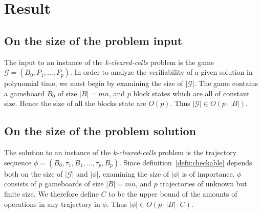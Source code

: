 \section{Result}

\subsection{On the size of the problem input}
The input to an instance of the \textit{k-cleared-cells} problem is the game $\mathcal{G} = (B_0, P_1, \ldots, P_p)$. In order to analyze the verifiability of a given solution in polynomial time, we must begin by examining the size of $|\mathcal{G}|$. The game contains a gameboard $B_0$ of size $|B| = mn$, and $p$ block states which are all of constant size. Hence the size of all the blocks state are $O(p)$. Thus $|\mathcal{G}| \in O(p \cdot |B|)$.

\subsection{On the size of the problem solution}
The solution to an instance of the \textit{k-cleared-cells} problem is the trajectory sequence $\phi=(B_0, \tau_1, B_1, \ldots ,\tau_p, B_p)$. Since definition~\ref{defn:checkable} depends both on the size of $|\mathcal{G}|$ and $|\phi|$, examining the size of $|\phi|$ is of importance. $\phi$ consists of $p$ gameboards of size $|B| = mn$, and $p$ trajectories of unknown but finite size. We therefore define $C$ to be the upper bound of the amounts of operations in any trajectory in $\phi$. Thus $|\phi| \in O(p \cdot |B| \cdot C)$.




